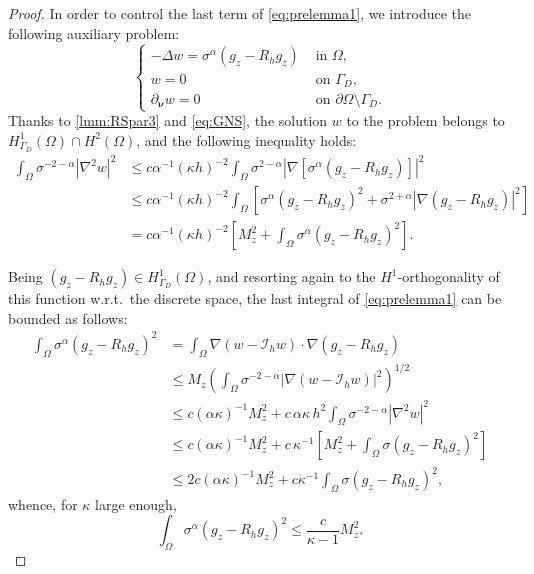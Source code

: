 \documentclass[final,hidelinks]{siamart1116Arxiv}
\numberwithin{theorem}{section}
\newcommand{\normal}{{\boldsymbol \nu}}
\newcommand{\interpol}{{\mathcal{I}}}
\begin{document}
\begin{proof}
In order to control the last term of \cref{eq:prelemma1}, we introduce the following auxiliary problem:
\begin{equation}
 \begin{cases}
  -\Delta w = \sigma^\alpha(g_z-R_hg_z) & \text{ in }\Omega,\\
  w = 0 & \text{ on }\Gamma_D,\\
  \partial_\normal w=0 & \text{ on }\partial\Omega\setminus\Gamma_D.
 \end{cases}
\end{equation}
Thanks to \cref{lmm:RSpar3} and \cref{eq:GNS}, the solution $w$ to the problem belongs to\linebreak[4] $H^1_{\Gamma_D}(\Omega)\cap H^2(\Omega)$, and the following inequality holds:
\begin{align}
 \int_\Omega\sigma^{-2-\alpha}|\nabla^2 w|^2 &\leq c\alpha^{-1}(\kappa h)^{-2}\int_\Omega\sigma^{2-\alpha}|\nabla[\sigma^\alpha(g_z-R_hg_z)]|^2\\
 &\leq c\alpha^{-1}(\kappa h)^{-2}\int_\Omega\left[\sigma^\alpha(g_z-R_hg_z)^2 + \sigma^{2+\alpha}|\nabla(g_z-R_hg_z)|^2\right]\\
 &= c\alpha^{-1}(\kappa h)^{-2}\left[M_z^2 + \int_\Omega \sigma^\alpha(g_z-R_hg_z)^2\right].
\end{align}

Being $(g_z-R_hg_z)\in H^1_{\Gamma_D}(\Omega)$, and resorting again to the $H^1$-orthogonality of this function w.r.t.\ the discrete space, the last integral of \cref{eq:prelemma1} can be bounded as follows:
\begin{equation}\label{eq:prepostlemma1}\begin{aligned}
 \int_\Omega\sigma^\alpha(g_z-R_hg_z)^2 &= \int_\Omega\nabla(w-\interpol_hw)\cdot\nabla(g_z-R_hg_z) \\
 &\leq M_z\left(\int_\Omega\sigma^{-2-\alpha}|\nabla(w-\interpol_hw)|^2\right)^{1/2}\\
 &\leq c(\alpha\kappa)^{-1}M_z^2 + c\,\alpha\kappa\,h^2\int_\Omega\sigma^{-2-\alpha}|\nabla^2w|^2\\
 &\leq c(\alpha\kappa)^{-1}M_z^2 + c\,\kappa^{-1}\left[M_z^2 + \int_\Omega\sigma(g_z-R_hg_z)^2\right] \\
 &\leq 2c(\alpha\kappa)^{-1} M_z^2 + c\kappa^{-1}\int_\Omega\sigma(g_z-R_hg_z)^2,
\end{aligned}\end{equation}
whence, for $\kappa$ large enough,
\begin{equation}\label{eq:postlemma1}
 \int_\Omega\sigma^\alpha(g_z-R_hg_z)^2 \leq \frac{c}{\kappa-1}M_z^2.
\end{equation}



\end{proof}
\end{document}

